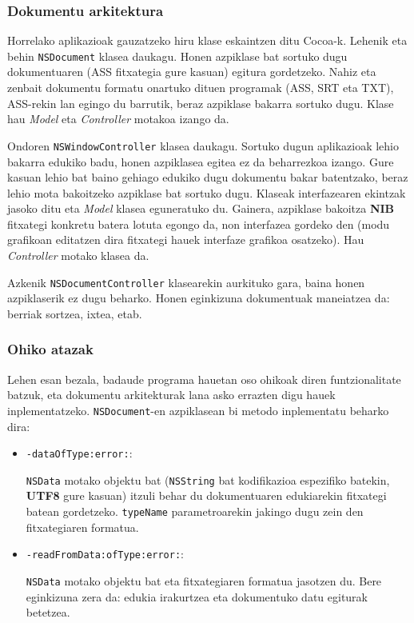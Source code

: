 \subsubsection{Dokumentu arkitektura}
Horrelako aplikazioak gauzatzeko hiru klase eskaintzen ditu Cocoa-k. Lehenik eta behin \texttt{NSDocument} klasea daukagu. Honen azpiklase bat sortuko dugu dokumentuaren (ASS fitxategia gure kasuan) egitura gordetzeko. Nahiz eta zenbait dokumentu formatu onartuko dituen programak (ASS, SRT eta TXT), ASS-rekin lan egingo du barrutik, beraz azpiklase bakarra sortuko dugu. Klase hau \textit{Model} eta \textit{Controller} motakoa izango da.

Ondoren \texttt{NSWindowController} klasea daukagu. Sortuko dugun aplikazioak lehio bakarra edukiko badu, honen azpiklasea egitea ez da beharrezkoa izango. Gure kasuan lehio bat baino gehiago edukiko dugu dokumentu bakar batentzako, beraz lehio mota bakoitzeko azpiklase bat sortuko dugu. Klaseak interfazearen ekintzak jasoko ditu eta \textit{Model} klasea eguneratuko du. Gainera, azpiklase bakoitza \textbf{NIB} fitxategi konkretu batera lotuta egongo da, non interfazea gordeko den (modu grafikoan editatzen dira fitxategi hauek interfaze grafikoa osatzeko). Hau \textit{Controller} motako klasea da.

Azkenik \texttt{NSDocumentController} klasearekin aurkituko gara, baina honen azpiklaserik ez dugu beharko. Honen eginkizuna dokumentuak maneiatzea da: berriak sortzea, ixtea, etab.

\subsubsection{Ohiko atazak}
Lehen esan bezala, badaude programa hauetan oso ohikoak diren funtzionalitate batzuk, eta dokumentu arkitekturak lana asko errazten digu hauek inplementatzeko. \texttt{NSDocument}-en azpiklasean bi metodo inplementatu beharko dira:
\begin{itemize}
\item \texttt{-dataOfType:error:}:

\texttt{NSData} motako objektu bat (\texttt{NSString} bat kodifikazioa espezifiko batekin, \textbf{UTF8} gure kasuan) itzuli behar du dokumentuaren edukiarekin fitxategi batean gordetzeko. \texttt{typeName} parametroarekin jakingo dugu zein den fitxategiaren formatua.

\item \texttt{-readFromData:ofType:error:}:

\texttt{NSData} motako objektu bat eta fitxategiaren formatua jasotzen du. Bere eginkizuna zera da: edukia irakurtzea eta dokumentuko datu egiturak betetzea.
\end{itemize}

